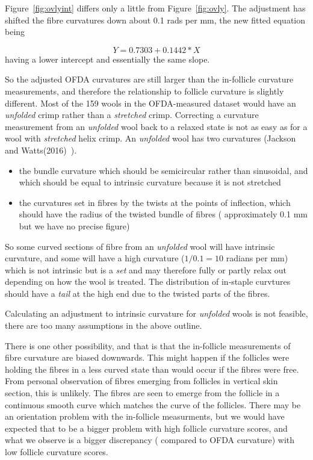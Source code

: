 \documentclass[titlepage]{article}  %
\begin{document}


Figure~\ref{fig:ovlyint} differs only a little from Figure~\ref{fig:ovly}. The adjustment has shifted the fibre curvatures down about 0.1 rads per mm, the new fitted equation being

\begin{displaymath}
Y = 0.7303 + 0.1442 * X
\end{displaymath}
 having a lower intercept and essentially the same slope.

So the adjusted OFDA curvatures are still larger than the in-follicle curvature measurements, and therefore the relationship to follicle curvature is slightly different. Most of the 159 wools in the OFDA-measured dataset would have an {\em unfolded} crimp rather than a {\em stretched} crimp. Correcting a curvature measurement from an {\em unfolded} wool back to a relaxed state is not as easy as for a wool with {\em stretched} helix crimp. An {\em unfolded} wool has two curvatures (Jackson and Watts(2016)~\cite{jack:16}).
\begin{itemize}
\item the bundle curvature which should be semicircular rather than sinusoidal, and which should be equal to intrinsic curvature because it is not stretched
\item the curvatures set in fibres by the twists at the points of inflection, which should have the radius of the twisted bundle of fibres ( approximately 0.1 mm but we have no precise figure)
\end{itemize}

So some curved sections of fibre from an {\em unfolded} wool will have intrinsic curvature, and some will have a high curvature ($1/0.1 = 10$ radians per mm) which is not intrinsic but is a {\em set} and may therefore fully or partly relax out depending on how the wool is treated. The distribution of in-staple curvtures should have a {\em tail} at the high end  due to the twisted parts of the fibres.

Calculating an adjustment to intrinsic curvature for {\em unfolded} wools is not feasible, there are too many assumptions in the above outline.

There is one other possibility, and that is that the in-follicle measurements of fibre curvature are biased downwards. This might happen if the follicles  were holding the fibres in a less curved state than would occur if the fibres were free. From personal observation of fibres emerging from follicles in vertical skin section, this is unlikely. The fibres are seen to emerge from the follicle in a continuous smooth curve which matches the curve of the follicles. There may be an orientation problem with the in-follicle measurments, but we would have expected that to be a bigger problem with high follicle curvature scores, and what we observe is a bigger discrepancy ( compared to OFDA curvature) with low follicle curvature scores.
\end{document}
